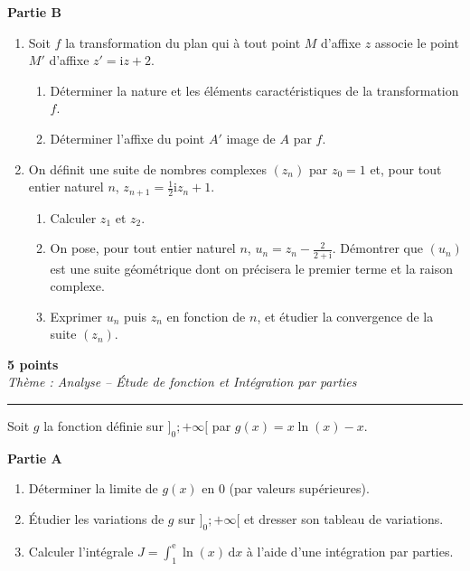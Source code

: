 \documentclass[12pt,a4paper]{article}
\newcommand{\exercice}[3][5]{%
    \noindent{\Large\textbf{Exercice #2}} \hfill \textbf{#1 points}\\[0.20cm]%
    {\normalsize\textit{#3}}%
    \par\vspace{0.28cm}\hrule\vspace{0.55cm}%
}
\newcommand{\partie}[1]{\vspace{0.45cm}\noindent\textbf{\large Partie #1}\par\vspace{0.25cm}}
\begin{document}
\partie{B}

\begin{enumerate}
    \item Soit $f$ la transformation du plan qui à tout point $M$ d'affixe $z$ associe le point $M'$ d'affixe $z' = \mathrm{i}z + 2$.
    \begin{enumerate}
        \item Déterminer la nature et les éléments caractéristiques de la transformation $f$.
        \item Déterminer l'affixe du point $A'$ image de $A$ par $f$.
    \end{enumerate}
    
    \item On définit une suite de nombres complexes $(z_n)$ par $z_0 = 1$ et, pour tout entier naturel $n$, $z_{n+1} = \frac{1}{2}\mathrm{i}z_n + 1$.
    \begin{enumerate}
        \item Calculer $z_1$ et $z_2$.
        \item On pose, pour tout entier naturel $n$, $u_n = z_n - \frac{2}{2 + \mathrm{i}}$. Démontrer que $(u_n)$ est une suite géométrique dont on précisera le premier terme et la raison complexe.
        \item Exprimer $u_n$ puis $z_n$ en fonction de $n$, et étudier la convergence de la suite $(z_n)$.
    \end{enumerate}
\end{enumerate}

\newpage

\exercice[5]{4}{Thème : Analyse -- Étude de fonction et Intégration par parties}

Soit $g$ la fonction définie sur $]_0; +\infty[$ par $g(x) = x\ln(x) - x$.

\vspace{0.45cm}

\partie{A}

\begin{enumerate}
    \item Déterminer la limite de $g(x)$ en $0$ (par valeurs supérieures).
    
    \vspace{0.45cm}
    \item Étudier les variations de $g$ sur $]_0; +\infty[$ et dresser son tableau de variations.
    
    \vspace{0.45cm}
    \item Calculer l'intégrale $J = \int_{1}^{\mathrm{e}} \ln(x)\,\mathrm{d}x$ à l'aide d'une intégration par parties.
\end{enumerate}
\end{document}
